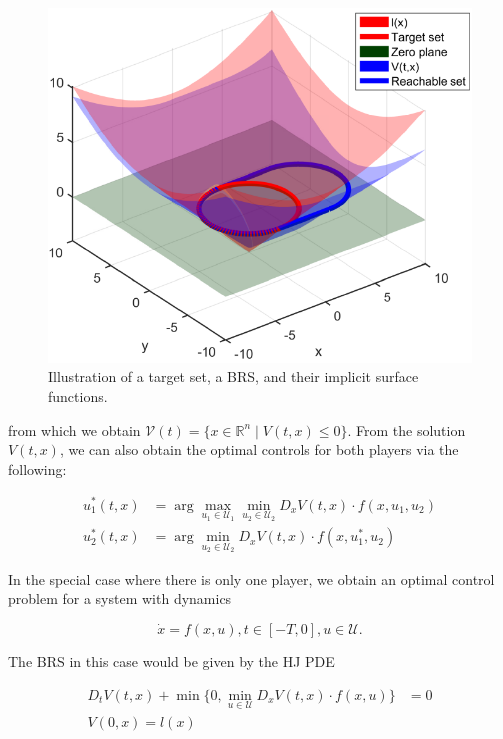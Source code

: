 \begin{figure}
	\centering
	\includegraphics[width=\columnwidth]{"RSExample"}
	\caption{Illustration of a target set, a BRS, and their implicit surface functions.}
	\label{fig:RSExample}
\end{figure}

\noindent from which we obtain $\mathcal{V}(t) = \{x\in\mathbb{R}^n \mid V(t,x)\le 0\}$. From the solution $V(t,x)$, we can also obtain the optimal controls for both players via the following:

\begin{equation} \label{eq:HJI_ctrl_syn}
\begin{aligned}
u_1^*(t,x) &= \arg \max_{u_1\in\mathcal{U}_1} \min_{u_2\in\mathcal U_2} D_x V(t,x) \cdot f(x,u_1,u_2)\\
u_2^*(t,x) &= \arg \min_{u_2\in\mathcal{U}_2} D_x V(t,x) \cdot f(x,u_1^*,u_2)
\end{aligned}
\end{equation}

In the special case where there is only one player, we obtain an optimal control problem for a system with dynamics

\begin{equation} \label{eq:dyn_d}
\dot{x} = f(x, u), t\in [-T,0], u\in\mathcal U.
\end{equation}

The BRS in this case would be given by the HJ PDE

\begin{equation} \label{eq:HJBPDE}
\begin{aligned}
D_t V(t,x) + \min \{0, \min_{u\in\mathcal{U}} D_x V(t,x) \cdot f(x,u)\} &= 0 \\
V(0,x) = l(x)&
\end{aligned}
\end{equation}

